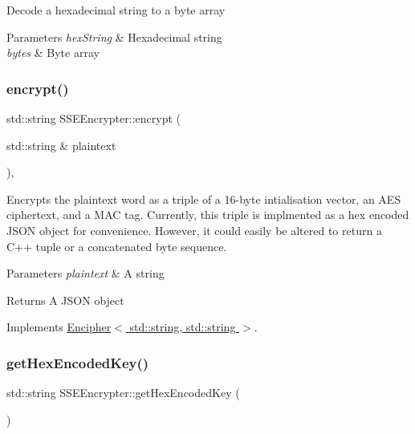 Decode a hexadecimal string to a byte array 
\begin{DoxyParams}{Parameters}
{\em hex\+String} & Hexadecimal string \\
\hline
{\em bytes} & Byte array \\
\hline
\end{DoxyParams}
\mbox{\label{classSSEEncrypter_ab13571d2a7a8875226bf8901cd080949}} 
\subsubsection{\texorpdfstring{encrypt()}{encrypt()}}
{\footnotesize\ttfamily std\+::string S\+S\+E\+Encrypter\+::encrypt (\begin{DoxyParamCaption}\item[{std\+::string \&}]{plaintext }\end{DoxyParamCaption})\hspace{0.3cm}{\ttfamily [override]}, {\ttfamily [virtual]}}

Encrypts the plaintext word as a triple of a 16-\/byte intialisation vector, an A\+ES ciphertext, and a M\+AC tag. Currently, this triple is implmented as a hex encoded J\+S\+ON object for convenience. However, it could easily be altered to return a C++ tuple or a concatenated byte sequence. 
\begin{DoxyParams}{Parameters}
{\em plaintext} & A string \\
\hline
\end{DoxyParams}
\begin{DoxyReturn}{Returns}
A J\+S\+ON object 
\end{DoxyReturn}


Implements \hyperlink{classEncipher_aaf8138eb280608bfd03c6eb762ffc010}{Encipher$<$ std\+::string, std\+::string $>$}.

\mbox{\label{classSSEEncrypter_a741ba1ef98a1f1b294ed3904738cd888}} 
\subsubsection{\texorpdfstring{get\+Hex\+Encoded\+Key()}{getHexEncodedKey()}}
{\footnotesize\ttfamily std\+::string S\+S\+E\+Encrypter\+::get\+Hex\+Encoded\+Key (\begin{DoxyParamCaption}{ }\end{DoxyParamCaption})}

